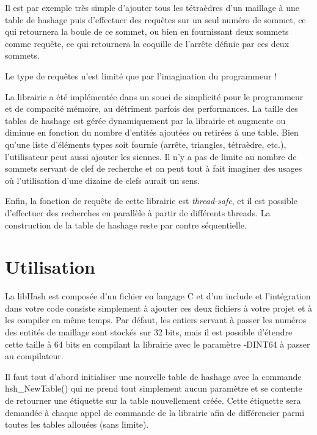 \documentclass[a4paper,12pt]{article}
\begin{document}
Il est par exemple très simple d'ajouter tous les tétraèdres d'un maillage à une table de hashage puis d'effectuer des requêtes sur un seul numéro de sommet, ce qui retournera la boule de ce sommet, ou bien en fournissant deux sommets comme requête, ce qui retournera la coquille de l'arrête définie par ces deux sommets.

Le type de requêtes n'est limité que par l'imagination du programmeur !

La librairie a été implémentée dans un souci de simplicité pour le programmeur et de compacité mémoire, au détriment parfois des performances.
La taille des tables de hashage est gérée dynamiquement par la librairie et augmente ou diminue en fonction du nombre d'entités ajoutées ou retirées à une table.
Bien qu'une liste d'éléments types soit fournie (arrête, triangles, tétraèdre, etc.), l'utilisateur peut aussi ajouter les siennes.
Il n'y a pas de limite au nombre de sommets servant de clef de recherche et on peut tout à fait imaginer des usages où l'utilisation d'une dizaine de clefs aurait un sens.

Enfin, la fonction de requête de cette librairie est \emph{thread-safe}, et il est possible d'effectuer des recherches en parallèle à partir de différents threads.
La construction de la table de hashage reste par contre séquentielle.


%
%

\section{Utilisation}

La libHash est composée d'un fichier en langage C et d'un include et l'intégration dans votre code consiste simplement à ajouter ces deux fichiers à votre projet et à les compiler en même temps.
Par défaut, les entiers servant à passer les numéros des entités de maillage sont stockés sur 32 bits, mais il est possible d'étendre cette taille à 64 bits en compilant la librairie avec le paramètre -DINT64 à passer au compilateur.

Il faut tout d'abord initialiser une nouvelle table de hashage avec la commande \\
hsh\_NewTable() qui ne prend tout simplement aucun paramètre et se contente de retourner une étiquette sur la table nouvellement créée.
Cette étiquette sera demandée à chaque appel de commande de la librairie afin de différencier parmi toutes les tables allouées (sans limite).
\end{document}
